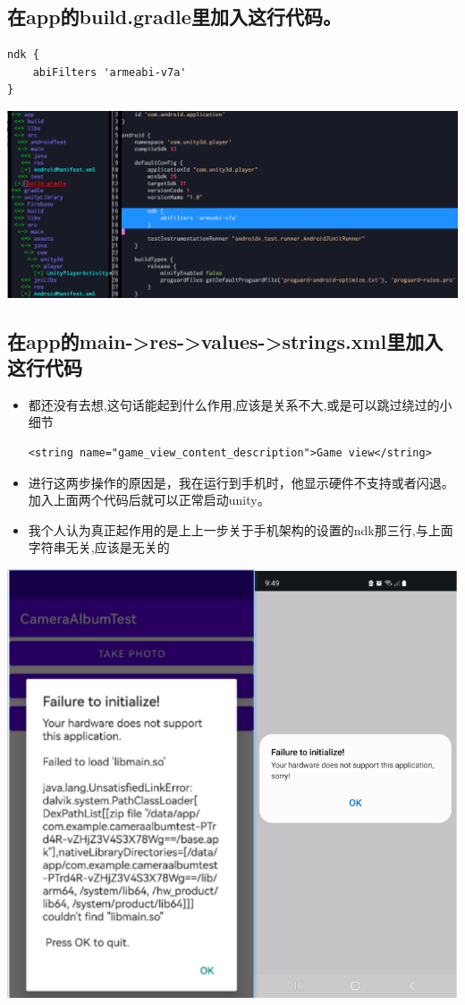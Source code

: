 \documentclass[9pt, b5paper]{article}
\begin{document}
\subsection{在app的build.gradle里加入这行代码。}
\label{sec-5-3}
\begin{verbatim}
ndk {
    abiFilters 'armeabi-v7a'
}
\end{verbatim}

\includegraphics[width=.9\linewidth]{./pic/unityToAndroid_20221123_223842.png}
\subsection{在app的main->res->values->strings.xml里加入这行代码}
\label{sec-5-4}
\begin{itemize}
\item 都还没有去想,这句话能起到什么作用,应该是关系不大,或是可以跳过绕过的小细节
\begin{verbatim}
<string name="game_view_content_description">Game view</string>
\end{verbatim}
\item 进行这两步操作的原因是，我在运行到手机时，他显示硬件不支持或者闪退。加入上面两个代码后就可以正常启动unity。
\item 我个人认为真正起作用的是上上一步关于手机架构的设置的ndk那三行,与上面字符串无关,应该是无关的
\end{itemize}

\includegraphics[width=.9\linewidth]{./pic/unityToAndroid_20221123_225409.png}
\end{document}
